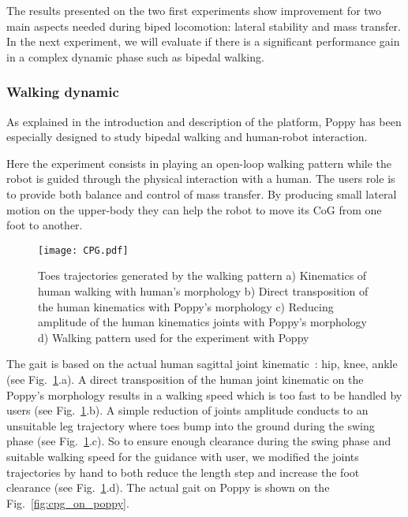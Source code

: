 The results presented on the two first experiments show improvement for two main aspects needed during biped locomotion: lateral stability and mass transfer.
In the next experiment, we will evaluate if there is a significant performance gain in a complex dynamic phase such as bipedal walking.



\subsubsection{Walking dynamic} %
\label{sub:walking_dynamic}

As explained in the introduction and description of the platform, Poppy has been especially designed to study bipedal walking and human-robot interaction.

Here the experiment consists in playing an open-loop walking pattern while the robot is guided through the physical interaction with a human.
The users role is to provide both balance and control of mass transfer.
By producing small lateral motion on the upper-body they can help the robot to move its CoG from one foot to another.

\begin{figure}[h]
    \centering
    \texttt{[image: CPG.pdf]}
    \caption{Toes trajectories generated by the walking pattern a) Kinematics of human walking
    with human's morphology b) Direct transposition of the human kinematics with Poppy's morphology
    c) Reducing amplitude of the human kinematics joints with Poppy's morphology d) Walking pattern
    used for the experiment with Poppy}
    \label{fig:CPG}
\end{figure}

The gait is based on the actual human sagittal joint kinematic~\cite{Nester2003}: hip, knee, ankle (see Fig.~\ref{fig:CPG}.a).
A direct transposition of the human joint kinematic on the Poppy's morphology results in a walking speed which is too fast to be handled by users (see Fig.~\ref{fig:CPG}.b).
A simple reduction of joints amplitude conducts to an unsuitable leg trajectory where toes bump into the ground during the swing phase (see Fig.~\ref{fig:CPG}.c).
So to ensure enough clearance during the swing phase and suitable walking speed for the guidance with user, we modified the joints trajectories by hand to both reduce the length step and increase the foot clearance (see Fig.~\ref{fig:CPG}.d).
The actual gait on Poppy is shown on the Fig.~\ref{fig:cpg_on_poppy}.


